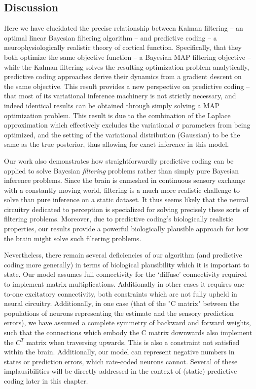 \subsection{Discussion}

Here we have elucidated the precise relationship between Kalman filtering -- an optimal linear Bayesian filtering algorithm -- and predictive coding -- a neurophysiologically realistic theory of cortical function. Specifically, that they both optimize the same objective function -- a Bayesian MAP filtering objective -- while the Kalman filtering solves the resulting optimization problem analytically, predictive coding approaches derive their dynamics from a gradient descent on the same objective. This result provides a new perspective on predictive coding -- that most of its variational inference machinery is not strictly necessary, and indeed identical results can be obtained through simply solving a MAP optimization problem. This result is due to the combination of the Laplace approximation which effectively excludes the variational $\sigma$ parameters from being optimized, and the setting of the variational distribution (Gaussian) to be the same as the true posterior, thus allowing for exact inference in this model.

Our work also demonstrates how straightforwardly predictive coding can be applied to solve Bayesian \emph{filtering} problems rather than simply pure Bayesian inference problems. Since the brain is enmeshed in continuous sensory exchange with a constantly moving world, filtering is a much more realistic challenge to solve than pure inference on a static dataset. It thus seems likely that the neural circuitry dedicated to perception is specialized for solving precisely these sorts of filtering problems. Moreover, due to predictive coding's biologically realistic properties, our results provide a powerful biologically plausible approach for how the brain might solve such filtering problems.

Nevertheless, there remain several deficiencies of our algorithm (and predictive coding more generally) in terms of biological plausibility which it is important to state. Our model assumes full connectivity for the `diffuse' connectivity required to implement matrix multiplications. Additionally in other cases it requires one-to-one excitatory connectivity, both constraints which are not fully upheld in neural circuitry. Additionally, in one case (that of the "C matrix" between the populations of neurons representing the estimate and the sensory prediction errors), we have assumed a complete symmetry of backward and forward weights, such that the connections which embody the C matrix downwards also implement the $C^T$ matrix when traversing upwards. This is also a constraint not satisfied within the brain. Additionally, our model can represent negative numbers in states or prediction errors, which rate-coded neurons cannot. Several of these implausibilities will be directly addressed in the context of (static) predictive coding later in this chapter.

